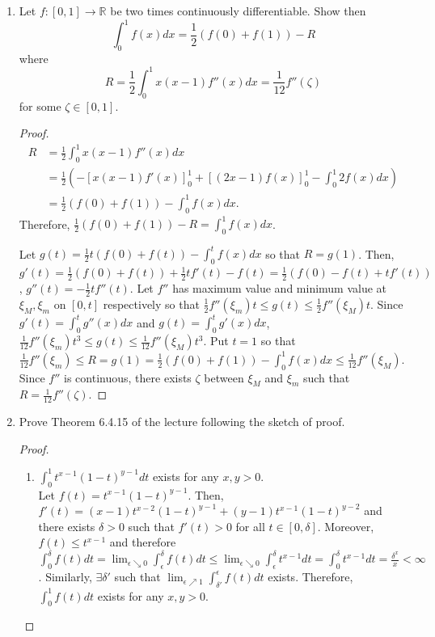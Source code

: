 \documentclass{article}
\begin{document}
\begin{enumerate}[font = \Large\bfseries\itshape\space, leftmargin = 3mm, labelsep = 3mm]
\item
Let $f : [0,1] \rightarrow \mathbb{R}$ be two times continuously differentiable.
Show then
$$\int_0^1 f(x)dx = \frac{1}{2}(f(0)+f(1))-R$$
where
$$R = \frac{1}{2} \int_0^1 x(x-1)f''(x)dx = \frac{1}{12} f''(\zeta)$$
for some $\zeta \in [0,1]$.

\begin{proof}
$$
\begin{aligned}
R &= \frac{1}{2}\int_0^1 x(x-1)f''(x)dx\\
&= \frac{1}{2}\left(-\left[x(x-1)f'(x)\right]_0^1 + \left[(2x-1)f(x)\right]_0^1 - \int_0^1 2f(x)dx \right)\\
&= \frac{1}{2}\left(f(0) + f(1)\right) - \int_0^1 f(x)dx.
\end{aligned}
$$
Therefore, $\frac{1}{2}(f(0) + f(1)) - R = \int_0^1 f(x)dx$.

Let $g(t) = \frac{1}{2}t(f(0) + f(t)) - \int_0^t f(x)dx$ so that $R = g(1)$.
Then, $g'(t) = \frac{1}{2}(f(0)+f(t)) + \frac{1}{2}tf'(t) - f(t) = \frac{1}{2}(f(0)-f(t) + tf'(t))$, $g''(t) = -\frac{1}{2}tf''(t)$.
Let $f''$ has maximum value and minimum value at $\xi_M, \xi_m$ on $[0,t]$ respectively so that $\frac{1}{2} f''(\xi_m)t \leq g(t) \leq \frac{1}{2} f''(\xi_M)t$.
Since $g'(t) = \int_0^t g''(x)dx$ and $g(t) = \int_0^t g'(x)dx$, $\frac{1}{12} f''(\xi_m) t^3 \leq g(t) \leq \frac{1}{12} f''(\xi_M)t^3$.
Put $t = 1$ so that $\frac{1}{12}f''(\xi_m) \leq R = g(1) = \frac{1}{2}(f(0)+f(1)) - \int_0^1 f(x)dx \leq \frac{1}{12} f''(\xi_M)$.
Since $f''$ is continuous, there exists $\zeta$ between $\xi_M$ and $\xi_m$ such that $R = \frac{1}{12}f''(\zeta)$.
\end{proof}

\item
Prove Theorem 6.4.15 of the lecture following the sketch of proof.
\begin{proof}
\begin{enumerate}[label=(\roman*)]
\item $\int_0^1 t^{x-1}(1-t)^{y-1}dt$ exists for any $x,y > 0$.\\
Let $f(t) = t^{x-1}(1-t)^{y-1}$.
Then, $f'(t) = (x-1)t^{x-2}(1-t)^{y-1} + (y-1)t^{x-1}(1-t)^{y-2}$ and there exists $\delta > 0$ such that $f'(t) > 0$ for all $t \in [0,\delta]$.
Moreover, $f(t) \leq t^{x-1}$ and therefore $\int_0^\delta f(t)dt = \lim_{\epsilon\searrow 0}\int_\epsilon^\delta f(t)dt \leq \lim_{\epsilon\searrow0}\int_\epsilon^\delta t^{x-1}dt = \int_0^{\delta} t^{x-1}dt = \frac{\delta^x}{x} < \infty$.
Similarly, $\exists \delta'$ such that $\lim_{\epsilon\nearrow 1}\int_{\delta'}^\epsilon f(t)dt$ exists.
Therefore, $\int_0^1 f(t)dt$ exists for any $x,y > 0$.


\end{enumerate}
\end{proof}
\end{enumerate}
\end{document}
